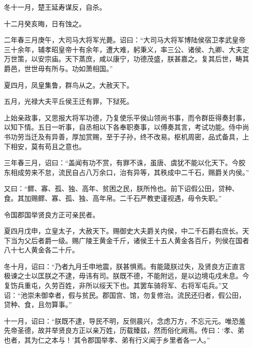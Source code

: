 \documentclass[12pt,UTF8]{ctexbook}
\begin{document}
冬十一月，楚王延寿谋反，自杀。



十二月癸亥晦，日有蚀之。



二年春三月庚午，大司马大将军光薨。诏曰：“大司马大将军博陆侯宿卫孝武皇帝三十余年，辅孝昭皇帝十有余年，遭大难，躬秉义，率三公、诸侯、九卿、大夫定万世策，以安宗庙。天下蒸庶，咸以康宁，功德茂盛，朕甚嘉之。复其后世，畴其爵邑，世世毋有所与。功如萧相国。”



夏四月，凤皇集鲁，群鸟从之。大赦天下。



五月，光禄大夫平丘侯王迁有罪，下狱死。



上始亲政事，又思报大将军功德，乃复使乐平侯山领尚书事，而令群臣得奏封事，以知下情。五日一听事，自丞相以下各奉职奏事，以傅奏其言，考试功能。侍中尚书功劳当迁及有异善，厚加赏赐，至于子孙，终不改易。枢机周密，品式备具，上下相安，莫有苟且之意也。



三年春三月，诏曰：“盖闻有功不赏，有罪不诛，虽唐、虞犹不能以化天下。今胶东相成劳来不怠，流民自占八万余口，治有异等，其秩成中二千石，赐爵关内侯。”



又曰：“鳏、寡、孤、独、高年、贫困之民，朕所怜也。前下诏假公田，贷种、食。其加赐鳏、寡、孤、独、高年帛。二千石严教吏谨视遇，毋令失职。”



令国郡国举贤良方正可亲民者。



夏四月戊申，立皇太子，大赦天下。赐御史大夫爵关内侯，中二千石爵右庶长。天下当为父后者爵一级。赐广陵王黄金千斤，诸侯王十五人黄金各百斤，列侯在国者八十七人黄金各二十斤。



冬十月，诏曰：“乃者九月壬申地震，朕甚惧焉。有能箴朕过失，及贤良方正直言极谏之士以匡朕之不逮，毋讳有司。朕既不德，不能附远，是以边境屯戍未息。今复饬兵重屯，久劳百姓，非所以绥天下也。其罢车骑将军、右将军屯兵。”又诏：“池崇未御幸者，假与贫民。郡国宫、馆，勿复修治。流民还归者，假公田，贷种、食，且勿算事。”



十一月，诏曰：“朕既不逮，导民不明，反侧晨兴，念虑万方，不忘元元。唯恐羞先帝圣德，故并举贤良方正以亲万姓，历载臻兹，然而俗化阙焉。传曰：‘孝、弟也者，其为仁之本与！’其令郡国举孝、弟有行义闻于乡里者各一人。”
\end{document}
